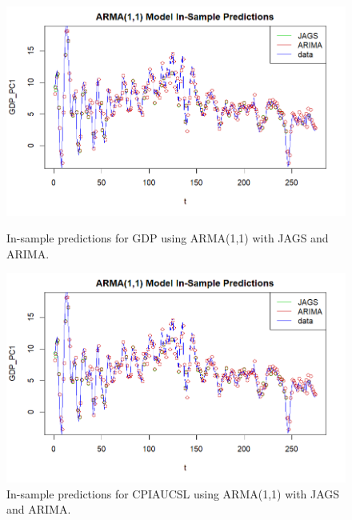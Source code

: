\begin{figure}[H]
    \centering
    \begin{minipage}{0.49\textwidth}
        \centering
        \includegraphics[width=\textwidth]{images/4-ARMA/ARIMA_ARMA_predictions_gdp.png}
        \caption{In-sample predictions for GDP using ARMA(1,1) with JAGS and ARIMA.}
        \label{fig:ARIMA_ARMA_gdp_prediction}
    \end{minipage}\hfill
    \begin{minipage}{0.49\textwidth}
        \centering
        \includegraphics[width=\textwidth]{images/4-ARMA/ARIMA_ARMA_predictions_gdp.png}
        \caption{In-sample predictions for CPIAUCSL using ARMA(1,1) with JAGS and ARIMA.}
        \label{fig:ARIMA_ARMA_infl_prediction}
    \end{minipage}
\end{figure}
